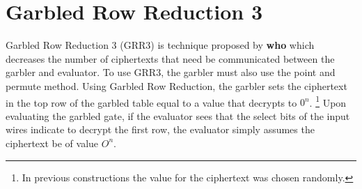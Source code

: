 \documentclass[12pt,twoside]{reedthesis}
\begin{document}

\section{Garbled Row Reduction 3}
Garbled Row Reduction 3 (GRR3) is technique proposed by \textbf{who} which decreases the number of ciphertexts that need be communicated between the garbler and evaluator.
To use GRR3, the garbler must also use the point and permute method.
Using Garbled Row Reduction, the garbler sets the ciphertext in the top row of the garbled table equal to a value that decrypts to $0^n$.
\footnote{In previous constructions the value for the ciphertext was chosen randomly.}
Upon evaluating the garbled gate, if the evaluator sees that the select bits of the input wires indicate to decrypt the first row, the evaluator simply assumes the ciphertext be of value $O^n$. 
\end{document}
